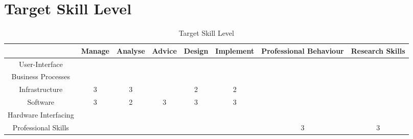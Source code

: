
\section{Target Skill Level}
\label{sec:target}


\begin{table}[H]
	\centering
	\begin{tabular}{|c|c|c|c|c|c|c|c|}
		\hline
		& Manage & Analyse & Advice & Design & Implement & Professional Behaviour & Research Skills \\ \hline
		User-Interface & & & & & & & \\ \hline
		Business Processes & & & & & & & \\ \hline
		Infrastructure & \cellcolor[HTML]{FD6864}3 & \cellcolor[HTML]{FD6864}3 & & 2 & 2 & & \\ \hline
		Software & \cellcolor[HTML]{FD6864}3 & 2 & \cellcolor[HTML]{FD6864}3 & \cellcolor[HTML]{FD6864}3 & 3 & & \\ \hline
		Hardware Interfacing & & & & & & & \\ \hline
		Professional Skills & & & & & & \cellcolor[HTML]{FD6864}3 & 3 \\ \hline             
	\end{tabular}
	\caption{Target Skill Level}
	\label{targetskills}
\end{table}